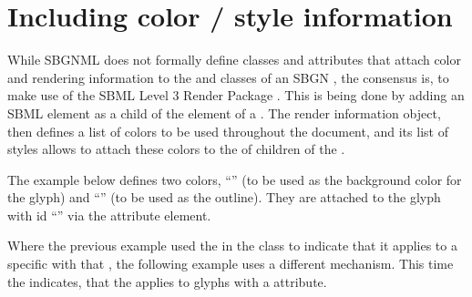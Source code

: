 
\section{Including color / style information}
\label{apdx-render}

While SBGNML does not formally define classes and attributes that attach color and rendering information to the \Glyph and \Arc classes of an SBGN \Map, the consensus is, to make use of the SBML Level 3 Render Package \citep{bergmann2018sbml}. This is being done by adding an SBML  element as a child of the  element of a \Map.  The render information object, then defines a list of colors to be used throughout the document, and its list of styles allows to attach these colors to the  of children of the \Map.

The example below defines two colors, ``'' (to be used as the background color for the glyph) and ``'' (to be used as the outline). They are attached to the glyph with id ``'' via the  attribute  element.


Where the previous example used the  in the \textbf{} class to indicate that it applies to a specific \Glyph with that , the following example uses a different mechanism. This time the  indicates, that the \textbf{} applies to glyphs with a  attribute.

